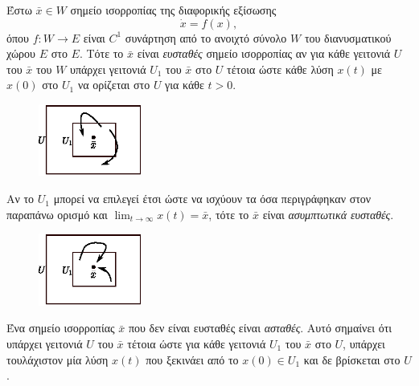 \begin{definition}
    Έστω \( \bar{x} \in W \) σημείο ισορροπίας της διαφορικής εξίσωσης
    \[
        \dot{x} = f(x),
    \]
    όπου \( f: W \to E \) είναι \( C^1 \) συνάρτηση από το ανοιχτό σύνολο \( W
    \) του διανυσματικού χώρου \( E \) στο \( E \). Τότε το \( \bar{x} \) είναι
    \emph{ευσταθές} σημείο ισορροπίας αν για κάθε γειτονιά \( U \) του
    \( \bar{x} \)
    του \( W \) υπάρχει γειτονιά \( U_1 \) του \( \bar{x} \) στο \( U \) τέτοια
    ώστε κάθε λύση \( x(t) \) με \( x(0) \) στο \( U_1 \) να ορίζεται στο \( U
    \) για κάθε \( t > 0 \).
\end{definition}
\begin{figure}[h!]
    \centering
    \includegraphics[width=0.3\textwidth]{figures/stab_stable.eps}
    \label{fig:stab_stable}
\end{figure}
\begin{definition}
    Αν το \( U_1 \) μπορεί να επιλεγεί έτσι ώστε να ισχύουν τα
    όσα περιγράφηκαν στον παραπάνω ορισμό και \( \lim_{t \to \infty}
    x(t) = \bar{x} \), τότε το \( \bar{x} \) είναι \emph{ασυμπτωτικά ευσταθές}.
\end{definition}
\begin{figure}[h!]
    \centering
    \includegraphics[width=0.3\textwidth]{figures/stab_asymp_stable.eps}
    \label{fig:stab_asymp_stable}
\end{figure}
\begin{definition} 
    Ένα σημείο ισορροπίας \( \bar{x} \) που δεν είναι ευσταθές είναι
    \emph{ασταθές}. Αυτό σημαίνει ότι υπάρχει γειτονιά \( U \) του \( \bar{x} \)
    τέτοια ώστε για κάθε γειτονιά \( U_1 \) του \( \bar{x} \) στο \( U \),
    υπάρχει τουλάχιστον μία λύση \( x(t) \) που ξεκινάει από το \( x(0) \in U_1 \)
    και δε βρίσκεται στο \( U \).
\end{definition}
